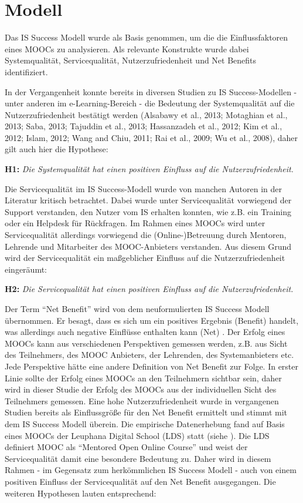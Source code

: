 \section{Modell}
\label{sec:modell}
Das IS Success Modell wurde als Basis genommen, um die die Einflussfaktoren eines MOOCs zu analysieren. Als relevante Konstrukte wurde dabei Systemqualität, Servicequalität, Nutzerzufriedenheit und Net Benefits identifiziert.  

In der Vergangenheit konnte bereits in diversen Studien zu IS Success-Modellen - unter anderen im e-Learning-Bereich - die Bedeutung der Systemqualität auf die Nutzerzufriedenheit bestätigt werden (Alsabawy et al., 2013; Motaghian et al., 2013; Saba, 2013; Tajuddin et al., 2013; Hassanzadeh et al., 2012; Kim et al., 2012; Islam, 2012; Wang and Chiu, 2011; Rai et al., 2009; Wu et al., 2008), daher gilt auch hier die Hypothese: \medskip

\textbf{H1:} \textit{Die Systemqualität hat einen positiven Einfluss auf die Nutzerzufriedenheit.} \medskip

Die Servicequalität im IS Success-Modell wurde von manchen Autoren in der Literatur kritisch betrachtet. Dabei wurde unter Servicequalität vorwiegend der Support verstanden, den Nutzer vom IS erhalten konnten, wie z.B. ein Training oder ein Helpdesk für Rückfragen. Im Rahmen eines MOOCs wird unter Servicequalität allerdings vorwiegend die (Online-)Betreuung durch Mentoren, Lehrende und Mitarbeiter des MOOC-Anbieters verstanden. Aus diesem Grund wird der Servicequalität ein maßgeblicher Einfluss auf die Nutzerzufriedenheit eingeräumt: \medskip

\textbf{H2:} \textit{Die Servicequalität hat einen positiven Einfluss auf die Nutzerzufriedenheit.}\medskip

Der Term "`Net Benefit"' wird von dem neuformulierten IS Success Modell übernommen. Er besagt, dass es sich um ein positives Ergebnis (Benefit) handelt, was allerdings auch negative Einflüsse enthalten kann (Net) \parencite[vgl.][S.2974]{delone2002information}. Der Erfolg eines MOOCs kann aus verschiedenen Perspektiven gemessen werden, z.B. aus Sicht des Teilnehmers, des MOOC Anbieters, der Lehrenden, des Systemanbieters etc. Jede Perspektive hätte eine andere Definition von Net Benefit zur Folge. In erster Linie sollte der Erfolg eines MOOCs an den Teilnehmern sichtbar sein, daher wird in dieser Studie der Erfolg des MOOCs aus der individuellen Sicht des Teilnehmers gemessen. Eine hohe Nutzerzufriedenheit wurde in vergangenen Studien bereits als Einflussgröße für den Net Benefit ermittelt und stimmt mit dem IS Success Modell überein. Die empirische Datenerhebung fand auf Basis eines MOOCs der Leuphana Digital School (LDS) statt (siehe ). Die LDS definiert MOOC als "`Mentored Open Online Course"' und weist der Servicequalität damit eine besondere Bedeutung zu. Daher wird in diesem Rahmen - im Gegensatz zum herkömmlichen IS Success Modell - auch von einem positiven Einfluss der Servicequalität auf den Net Benefit ausgegangen. Die weiteren Hypothesen lauten entsprechend: \medskip


